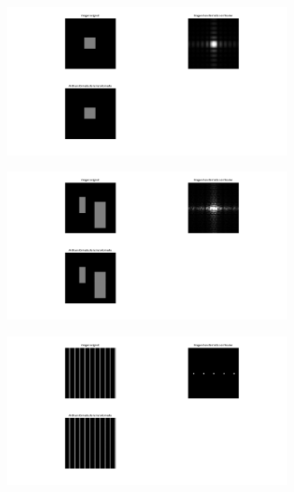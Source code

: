 \documentclass{article}
\begin{document}
\begin{figure}[H]
    \begin{subfigure}{0.5\textwidth}
        \includegraphics[width=0.9\textwidth]{ej3.png}
    \end{subfigure}\hfill
    \begin{subfigure}{0.5\textwidth}
        \includegraphics[width=0.9\textwidth]{ej3-otro.png}
    \end{subfigure}\hfill
    \begin{subfigure}{0.5\textwidth}
        \includegraphics[width=0.9\textwidth]{ej3-otro2.png}

\end{subfigure}
\end{figure}
\end{document}

